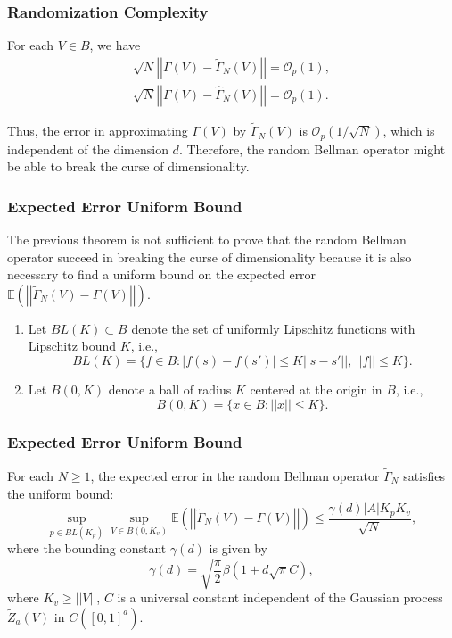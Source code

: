 \documentclass{beamer}
\begin{document}
\begin{frame}[fragile]
\frametitle{Randomization Complexity}

\begin{theorem}
For each $V\in B$, we have
\begin{gather*}
\sqrt{N}\left|\left|\Gamma(V)-\widetilde{\Gamma}_N(V)\right|\right|=\mathcal{O}_p(1),\\
\sqrt{N}\left|\left|\Gamma(V)-\widehat{\Gamma}_N(V)\right|\right|=\mathcal{O}_p(1).
\end{gather*}
\end{theorem}
Thus, the error in approximating $\Gamma(V)$ by $\widetilde{\Gamma}_N(V)$ is $\mathcal{O}_p(1/\sqrt{N})$, which is independent of the dimension $d$. Therefore, the random Bellman operator might be able to break the curse of dimensionality.
\end{frame}

\begin{frame}[fragile]
\frametitle{Expected Error Uniform Bound}

The previous theorem is not sufficient to prove that the random Bellman operator succeed in breaking the curse of dimensionality because it is also necessary to find a uniform bound on the expected error $\mathbb{E}\left(\left|\left|\widetilde{\Gamma}_N(V)-\Gamma(V)\right|\right|\right)$.

\begin{definition}
\begin{enumerate}
\item Let $BL(K)\subset B$ denote the set of uniformly Lipschitz functions with Lipschitz bound $K$, i.e.,
\[
BL(K)=\{f\in B: |f(s)-f(s')|\leq K||s-s'||,\, ||f||\leq K\}.
\]
\item Let $B(0, K)$ denote a ball of radius $K$ centered at the origin in $B$, i.e.,
\[
B(0, K)=\{x\in B: ||x||\leq K\}.
\]
\end{enumerate}
\end{definition}
\end{frame}

\begin{frame}[fragile]
\frametitle{Expected Error Uniform Bound}

\begin{theorem}
For each $N\geq1$, the expected error in the random Bellman operator $\widetilde{\Gamma}_N$ satisfies the uniform bound:
\[
\sup_{p\in BL(K_p)}\sup_{V\in B(0, K_v)}\mathbb{E}\left(\left|\left|\widetilde{\Gamma}_N(V)-\Gamma(V)\right|\right|\right)\leq\frac{\gamma(d)|A|K_pK_v}{\sqrt{N}},
\]
where the bounding constant $\gamma(d)$ is given by
\[
\gamma(d)=\sqrt{\frac{\pi}{2}}\beta(1+d\sqrt{\pi}C),
\]
where $K_v\geq||V||$, $C$ is a universal constant independent of the Gaussian process $\widetilde{Z}_a(V)$ in $C([0, 1]^d)$.
\end{theorem}
\end{frame}
\end{document}
